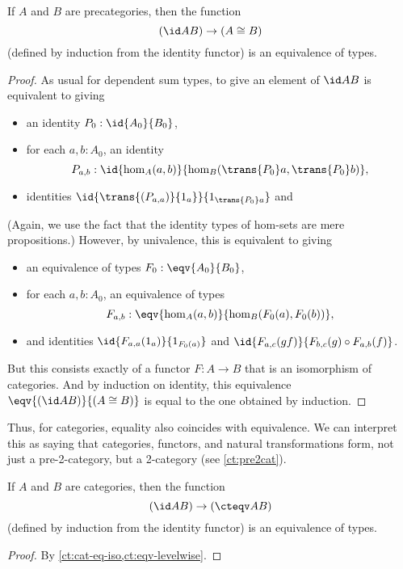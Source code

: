 \begin{lem}\label{ct:cat-eq-iso}
  If $A$ and $B$ are precategories, then the function
  \[(\id A B) \to (A\cong B)\]
  (defined by induction from the identity functor) is an equivalence of types.
\end{lem}
\begin{proof}
  As usual for dependent sum types, to give an element of $\id A B$ is equivalent to giving
  \begin{itemize}
  \item an identity $P_0:\id{A_0}{B_0}$,
  \item for each $a,b:A_0$, an identity
    \[P_{a,b}:\id{\hom_A(a,b)}{\hom_B(\trans {P_0} a,\trans {P_0} b)},\]
  \item identities $\id{\trans {(P_{a,a})} {1_a}}{1_{\trans {P_0} a}}$ and
  \end{itemize}
  (Again, we use the fact that the identity types of hom-sets are mere propositions.)
  However, by univalence, this is equivalent to giving
  \begin{itemize}
  \item an equivalence of types $F_0:\eqv{A_0}{B_0}$,
  \item for each $a,b:A_0$, an equivalence of types
    \[F_{a,b}:\eqv{\hom_A(a,b)}{\hom_B(F_0 (a),F_0 (b))},\]
  \item and identities $\id{F_{a,a}(1_a)}{1_{F_0 (a)}}$ and $\id{F_{a,c}(gf)}{F_{b,c} (g)\circ F_{a,b} (f)}$.
  \end{itemize}
  But this consists exactly of a functor $F:A\to B$ that is an isomorphism of categories.
  And by induction on identity, this equivalence $\eqv{(\id A B)}{(A\cong B)}$ is equal to the one obtained by induction.
\end{proof}

Thus, for categories, equality also coincides with equivalence.
We can interpret this as saying that categories, functors, and natural transformations form, not just a pre-2-category, but a 2-category (see \cref{ct:pre2cat}).

\begin{thm}\label{ct:cat-2cat}
  If $A$ and $B$ are categories, then the function
  \[(\id A B) \to (\cteqv A B)\]
  (defined by induction from the identity functor) is an equivalence of types.
\end{thm}
\begin{proof}
  By \cref{ct:cat-eq-iso,ct:eqv-levelwise}.
\end{proof}

